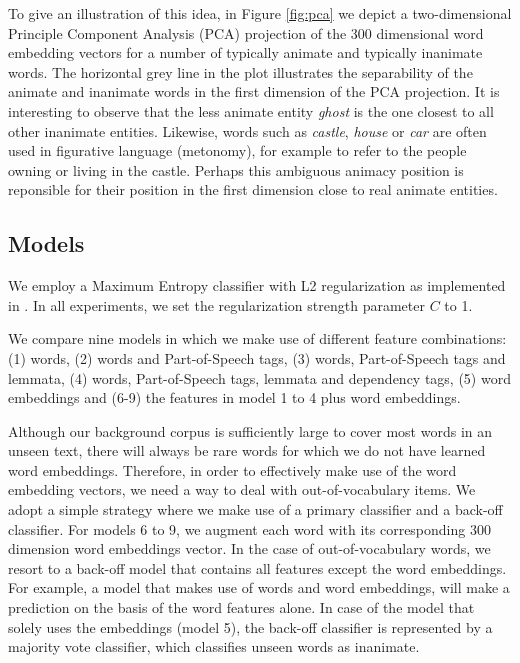 \documentclass[a4paper,UKenglish]{oasics}
\begin{document}
To give an illustration of this idea, in Figure \ref{fig:pca} we depict a
two-dimensional Principle Component Analysis (PCA) projection of the 300 dimensional
word embedding vectors for a number of typically animate and typically inanimate
 words. The horizontal grey line in the plot illustrates the separability of
 the animate and inanimate words in the first dimension of the PCA projection.
 It is interesting to observe that the less animate entity \emph{ghost} is the
 one closest to all other inanimate entities. Likewise, words such as \emph{castle},
 \emph{house} or \emph{car} are often used in figurative language (metonomy),
 for example to refer to the people owning or living in the castle. Perhaps this
 ambiguous animacy position is reponsible for their position in the first dimension
 close to real animate entities.
\subsection{Models}
We employ a Maximum Entropy classifier with L2 regularization as
implemented in \cite{sklearn}. In all experiments, we set the
regularization strength parameter $C$ to 1.

We compare nine models in which we make use of different feature
combinations: (1) words, (2) words and Part-of-Speech tags, (3)
words, Part-of-Speech tags and lemmata, (4) words, Part-of-Speech
tags, lemmata and dependency tags, (5) word embeddings and (6-9) the
features in model 1 to 4 plus word embeddings.

Although our background corpus is sufficiently large to cover most
words in an unseen text, there will always be rare words for which we
do not have learned word embeddings. Therefore, in order to
effectively make use of the word embedding vectors, we need a way to
deal with out-of-vocabulary items. We adopt a simple strategy where we
make use of a primary classifier and a back-off classifier. For models
6 to 9, we augment each word with its corresponding 300 dimension word
embeddings vector. In the case of out-of-vocabulary words, we resort
to a back-off model that contains all features except the word
embeddings. For example, a model that makes use of words and word
embeddings, will make a prediction on the basis of the word features
alone. In case of the model that solely uses the embeddings (model 5),
the back-off classifier is represented by a majority vote classifier,
which classifies unseen words as inanimate.
\end{document}
